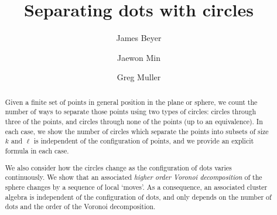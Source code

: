 \documentclass[11pt,oneside]{amsart}
\title{Separating dots with circles}
\author{James Beyer}
\author{Jaewon Min}
\author{Greg Muller}
\theoremstyle{definition}
\theoremstyle{remark}
\numberwithin{equation}{section}
\begin{document}
\begin{abstract}
Given a finite set of points in general position in the plane or sphere, we count the number of ways to separate those points using two types of circles: circles through three of the points, and circles through none of the points (up to an equivalence). In each case, we show the number of circles which separate the points into subsets of size $k$ and $\ell$ is independent of the configuration of points, and we provide an explicit formula in each case.

We also consider how the circles change as the configuration of dots varies continuously. We show that an associated \emph{higher order Voronoi decomposition} of the sphere changes by a sequence of local `moves'. As a consequence, an associated cluster algebra is independent of the configuration of dots, and only depends on the number of dots and the order of the Voronoi decomposition.

%
%
\end{abstract}



\end{document}
